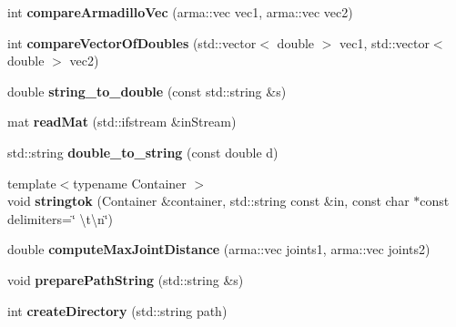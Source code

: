 \begin{DoxyCompactItemize}
\item 
\hypertarget{namespacekukadu_ac23d451b73ca627a0b9798b8f940ba22}{int {\bfseries compare\-Armadillo\-Vec} (arma\-::vec vec1, arma\-::vec vec2)}\label{namespacekukadu_ac23d451b73ca627a0b9798b8f940ba22}

\item 
\hypertarget{namespacekukadu_a20bd3cddb2a809db91032ee08336f7c1}{int {\bfseries compare\-Vector\-Of\-Doubles} (std\-::vector$<$ double $>$ vec1, std\-::vector$<$ double $>$ vec2)}\label{namespacekukadu_a20bd3cddb2a809db91032ee08336f7c1}

\item 
\hypertarget{namespacekukadu_a98d5b3b19d52db3ae4d0ec86544828c3}{double {\bfseries string\-\_\-to\-\_\-double} (const std\-::string \&s)}\label{namespacekukadu_a98d5b3b19d52db3ae4d0ec86544828c3}

\item 
\hypertarget{namespacekukadu_a098f6e18074cc91c0ce93dfa8b3c214c}{mat {\bfseries read\-Mat} (std\-::ifstream \&in\-Stream)}\label{namespacekukadu_a098f6e18074cc91c0ce93dfa8b3c214c}

\item 
\hypertarget{namespacekukadu_a96a0b0e4ddea21ce59c048facc488565}{std\-::string {\bfseries double\-\_\-to\-\_\-string} (const double d)}\label{namespacekukadu_a96a0b0e4ddea21ce59c048facc488565}

\item 
\hypertarget{namespacekukadu_adc0c3a0b9a1affd427c8585758459256}{{\footnotesize template$<$typename Container $>$ }\\void {\bfseries stringtok} (Container \&container, std\-::string const \&in, const char $\ast$const delimiters=\char`\"{} \textbackslash{}t\textbackslash{}n\char`\"{})}\label{namespacekukadu_adc0c3a0b9a1affd427c8585758459256}

\item 
\hypertarget{namespacekukadu_a28a41c42826259bab68aed7975b56c83}{double {\bfseries compute\-Max\-Joint\-Distance} (arma\-::vec joints1, arma\-::vec joints2)}\label{namespacekukadu_a28a41c42826259bab68aed7975b56c83}

\item 
\hypertarget{namespacekukadu_a1a615b8c4aa3b3478ac8275cbcd15275}{void {\bfseries prepare\-Path\-String} (std\-::string \&s)}\label{namespacekukadu_a1a615b8c4aa3b3478ac8275cbcd15275}

\item 
\hypertarget{namespacekukadu_a90844d1af728408298335074234cb6bf}{int {\bfseries create\-Directory} (std\-::string path)}\label{namespacekukadu_a90844d1af728408298335074234cb6bf}


\end{DoxyCompactItemize}
